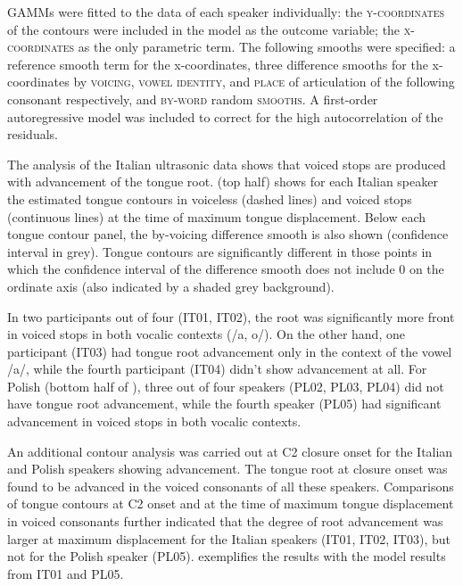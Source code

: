 \documentclass[authoryear, twocolumn]{elsarticle}
\begin{document}
GAMMs were fitted to the data of each speaker individually: the
\textsc{y-coordinates} of the contours were included in the model as the
outcome variable; the \textsc{x-coordinates} as the only parametric
term. The following smooths were specified: a reference smooth term for
the x-coordinates, three difference smooths for the x-coordinates by
\textsc{voicing}, \textsc{vowel identity}, and \textsc{place} of
articulation of the following consonant respectively, and
\textsc{by-word} random \textsc{smooths}. A first-order autoregressive
model was included to correct for the high autocorrelation of the
residuals.

The analysis of the Italian ultrasonic data shows that voiced stops are
produced with advancement of the tongue root.  (top half)
shows for each Italian speaker the estimated tongue contours in
voiceless (dashed lines) and voiced stops (continuous lines) at the time
of maximum tongue displacement. Below each tongue contour panel, the
by-voicing difference smooth is also shown (confidence interval in
grey). Tongue contours are significantly different in those points in
which the confidence interval of the difference smooth does not include
0 on the ordinate axis (also indicated by a shaded grey background).

In two participants out of four (IT01, IT02), the root was significantly
more front in voiced stops in both vocalic contexts (/a, o/). On the
other hand, one participant (IT03) had tongue root advancement only in
the context of the vowel /a/, while the fourth participant (IT04) didn't
show advancement at all. For Polish (bottom half of ), three
out of four speakers (PL02, PL03, PL04) did not have tongue root
advancement, while the fourth speaker (PL05) had significant advancement
in voiced stops in both vocalic contexts.

An additional contour analysis was carried out at C2 closure onset for
the Italian and Polish speakers showing advancement. The tongue root at
closure onset was found to be advanced in the voiced consonants of all
these speakers. Comparisons of tongue contours at C2 onset and at the
time of maximum tongue displacement in voiced consonants further
indicated that the degree of root advancement was larger at maximum
displacement for the Italian speakers (IT01, IT02, IT03), but not for
the Polish speaker (PL05).  exemplifies the results with
the model results from IT01 and PL05.
\end{document}
